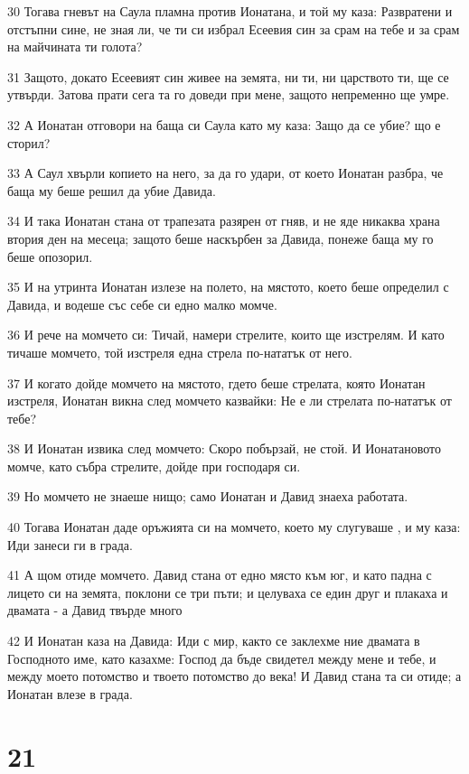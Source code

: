 \par 30 Тогава гневът на Саула пламна против Ионатана, и той му каза: Развратени и отстъпни сине, не зная ли, че ти си избрал Есеевия син за срам на тебе и за срам на майчината ти голота?
\par 31 Защото, докато Есеевият син живее на земята, ни ти, ни царството ти, ще се утвърди. Затова прати сега та го доведи при мене, защото непременно ще умре.
\par 32 А Ионатан отговори на баща си Саула като му каза: Защо да се убие? що е сторил?
\par 33 А Саул хвърли копието на него, за да го удари, от което Ионатан разбра, че баща му беше решил да убие Давида.
\par 34 И така Ионатан стана от трапезата разярен от гняв, и не яде никаква храна втория ден на месеца; защото беше наскърбен за Давида, понеже баща му го беше опозорил.
\par 35 И на утринта Ионатан излезе на полето, на мястото, което беше определил с Давида, и водеше със себе си едно малко момче.
\par 36 И рече на момчето си: Тичай, намери стрелите, които ще изстрелям. И като тичаше момчето, той изстреля една стрела по-нататък от него.
\par 37 И когато дойде момчето на мястото, гдето беше стрелата, която Ионатан изстреля, Ионатан викна след момчето казвайки: Не е ли стрелата по-нататък от тебе?
\par 38 И Ионатан извика след момчето: Скоро побързай, не стой. И Ионатановото момче, като събра стрелите, дойде при господаря си.
\par 39 Но момчето не знаеше нищо; само Ионатан и Давид знаеха работата.
\par 40 Тогава Ионатан даде оръжията си на момчето, което му слугуваше , и му каза: Иди занеси ги в града.
\par 41 А щом отиде момчето. Давид стана от едно място към юг, и като падна с лицето си на земята, поклони се три пъти; и целуваха се един друг и плакаха и двамата - а Давид твърде много
\par 42 И Ионатан каза на Давида: Иди с мир, както се заклехме ние двамата в Господното име, като казахме: Господ да бъде свидетел между мене и тебе, и между моето потомство и твоето потомство до века! И Давид стана та си отиде; а Ионатан влезе в града.

\chapter{21}

